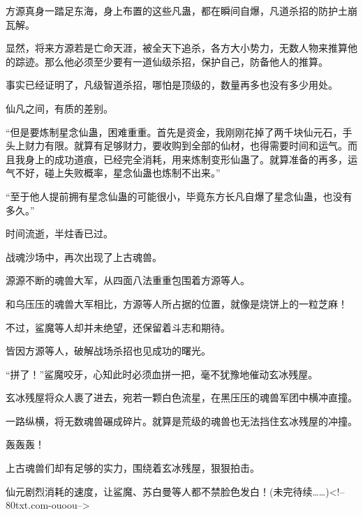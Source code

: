 \begin{this_body}
方源真身一踏足东海，身上布置的这些凡蛊，都在瞬间自爆，凡道杀招的防护土崩瓦解。

显然，将来方源若是亡命天涯，被全天下追杀，各方大小势力，无数人物来推算他的踪迹。那么他必须至少要有一道仙级杀招，保护自己，防备他人的推算。

事实已经证明了，凡级智道杀招，哪怕是顶级的，数量再多也没有多少用处。

仙凡之间，有质的差别。

“但是要炼制星念仙蛊，困难重重。首先是资金，我刚刚花掉了两千块仙元石，手头上财力有限。就算有足够财力，要收购到全部的仙材，也得需要时间和运气。而且我身上的成功道痕，已经完全消耗，用来炼制变形仙蛊了。就算准备的再多，运气不好，碰上失败概率，星念仙蛊也炼制不出来。”

“至于他人提前拥有星念仙蛊的可能很小，毕竟东方长凡自爆了星念仙蛊，也没有多久。”

时间流逝，半炷香已过。

战魂沙场中，再次出现了上古魂兽。

源源不断的魂兽大军，从四面八法重重包围着方源等人。

和乌压压的魂兽大军相比，方源等人所占据的位置，就像是烧饼上的一粒芝麻！

不过，鲨魔等人却并未绝望，还保留着斗志和期待。

皆因方源等人，破解战场杀招也见成功的曙光。

“拼了！”鲨魔咬牙，心知此时必须血拼一把，毫不犹豫地催动玄冰残屋。

玄冰残屋将众人裹了进去，宛若一颗白色流星，在黑压压的魂兽军团中横冲直撞。

一路纵横，将无数魂兽碾成碎片。就算是荒级的魂兽也无法挡住玄冰残屋的冲撞。

轰轰轰！

上古魂兽们却有足够的实力，围绕着玄冰残屋，狠狠拍击。

仙元剧烈消耗的速度，让鲨魔、苏白曼等人都不禁脸色发白！(未完待续……)<!--80txt.com-ouoou-->

\end{this_body}

